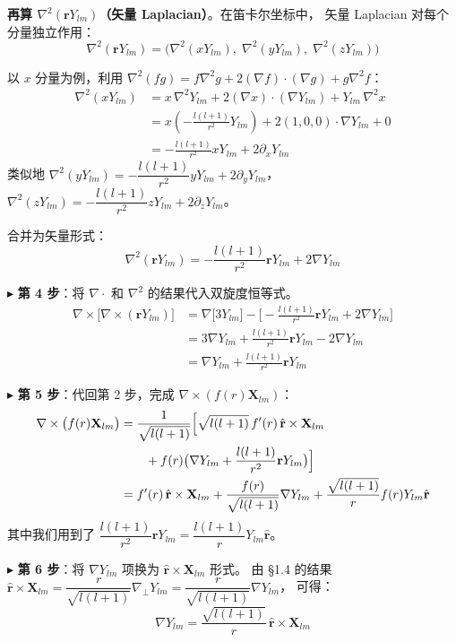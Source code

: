 \textbf{再算 $\nabla^2(\mathbf{r}Y_{lm})$（矢量 Laplacian）}。在笛卡尔坐标中，
矢量 Laplacian 对每个分量独立作用：
$$
\nabla^2(\mathbf{r}Y_{lm}) = \bigl(\nabla^2(xY_{lm}),\; \nabla^2(yY_{lm}),\; \nabla^2(zY_{lm})\bigr)
$$

以 $x$ 分量为例，利用 $\nabla^2(fg) = f\nabla^2 g + 2(\nabla f)\cdot(\nabla g) + g\nabla^2 f$：
\begin{align*}
\nabla^2(xY_{lm}) &= x\,\nabla^2 Y_{lm} + 2(\nabla x)\cdot(\nabla Y_{lm}) + Y_{lm}\,\nabla^2 x \\
&= x\left(-\frac{l(l+1)}{r^2}Y_{lm}\right) + 2(1,0,0)\cdot\nabla Y_{lm} + 0 \\
&= -\frac{l(l+1)}{r^2}xY_{lm} + 2\partial_x Y_{lm}
\end{align*}
类似地 $\nabla^2(yY_{lm}) = -\dfrac{l(l+1)}{r^2}yY_{lm} + 2\partial_y Y_{lm}$，
$\nabla^2(zY_{lm}) = -\dfrac{l(l+1)}{r^2}zY_{lm} + 2\partial_z Y_{lm}$。

合并为矢量形式：
$$
\nabla^2(\mathbf{r}Y_{lm})
= -\frac{l(l+1)}{r^2}\mathbf{r}Y_{lm} + 2\nabla Y_{lm}
$$

$\blacktriangleright$ \textbf{第 4 步}：将 $\nabla\cdot$ 和 $\nabla^2$ 的结果代入双旋度恒等式。
\begin{align*}
\nabla\times\bigl[\nabla\times(\mathbf{r}Y_{lm})\bigr]
&= \nabla\bigl[3Y_{lm}\bigr] - \bigl[-\frac{l(l+1)}{r^2}\mathbf{r}Y_{lm} + 2\nabla Y_{lm}\bigr] \\
&= 3\nabla Y_{lm} + \frac{l(l+1)}{r^2}\mathbf{r}Y_{lm} - 2\nabla Y_{lm} \\
&= \nabla Y_{lm} + \frac{l(l+1)}{r^2}\mathbf{r}Y_{lm}
\end{align*}

$\blacktriangleright$ \textbf{第 5 步}：代回第 2 步，完成 $\nabla\times(f(r)\mathbf{X}_{lm})$：
\begin{align*}
\nabla\times\bigl(f(r)\mathbf{X}_{lm}\bigr)
&= \frac{1}{\sqrt{l(l+1)}}\Bigl[
   \sqrt{l(l+1)}\,f'(r)\,\hat{\mathbf{r}}\times\mathbf{X}_{lm} \notag\\
&\qquad + f(r)\bigl(\nabla Y_{lm} + \frac{l(l+1)}{r^2}\mathbf{r}Y_{lm}\bigr)
   \Bigr] \notag\\
&= f'(r)\,\hat{\mathbf{r}}\times\mathbf{X}_{lm}
   + \frac{f(r)}{\sqrt{l(l+1)}}\nabla Y_{lm}
   + \frac{\sqrt{l(l+1)}}{r}f(r)Y_{lm}\hat{\mathbf{r}}
\end{align*}
其中我们用到了 $\dfrac{l(l+1)}{r^2}\mathbf{r}Y_{lm} = \dfrac{l(l+1)}{r}Y_{lm}\hat{\mathbf{r}}$。

$\blacktriangleright$ \textbf{第 6 步}：将 $\nabla Y_{lm}$ 项换为 $\hat{\mathbf{r}}\times\mathbf{X}_{lm}$ 形式。
由 §1.4 的结果 $\hat{\mathbf{r}}\times\mathbf{X}_{lm} = \dfrac{r}{\sqrt{l(l+1)}}\nabla_\perp Y_{lm} = \dfrac{r}{\sqrt{l(l+1)}}\nabla Y_{lm}$，
可得：
$$
\nabla Y_{lm} = \frac{\sqrt{l(l+1)}}{r}\,\hat{\mathbf{r}}\times\mathbf{X}_{lm}
$$

